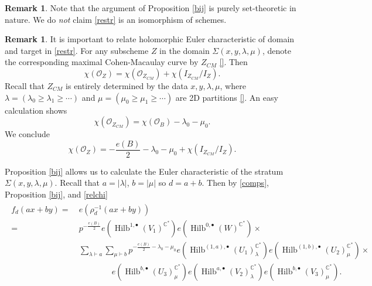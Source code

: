 \documentclass{amsart}
\theoremstyle{definition}
\newtheorem{remark}[theorem]{Remark}
\newcommand{\CC} {\mathbb{C}}          %
\renewcommand{\O}{\mathcal{O}}
\newcommand{\Hilb}{\operatorname{Hilb}}
\begin{document}
\begin{remark}
Note that the argument of Proposition \ref{bij} is purely set-theoretic in nature. We do \emph{not} claim \eqref{restr} is an isomorphism of schemes. 
\end{remark}

\begin{remark}
It is important to relate holomorphic Euler characteristic of domain and target in \eqref{restr}. For any subscheme $Z$ in the domain $\Sigma(x,y,\lambda,\mu)$, denote the corresponding maximal Cohen-Macaulay curve by $Z_{CM}$ \ref{}. Then
$$
\chi(\O_Z) = \chi(\O_{Z_{CM}}) + \chi(I_{Z_{CM}} / I_{Z}).
$$ 
Recall that $Z_{CM}$ is entirely determined by the data $x,y, \lambda, \mu$, where $\lambda = (\lambda_0 \geq \lambda_1 \geq \cdots)$ and $\mu = (\mu_0 \geq \mu_1 \geq \cdots)$ are 2D partitions \ref{}. An easy calculation shows 
$$
\chi(\O_{Z_{CM}}) = \chi(\O_B) - \lambda_0 - \mu_0.
$$
We conclude
\begin{equation} \label{relchi}
\chi(\O_Z) = -\frac{e(B)}{2} - \lambda_0 - \mu_0 + \chi(I_{Z_{CM}} / I_{Z}).
\end{equation}
\end{remark}

Proposition \ref{bij} allows us to calculate the Euler characteristic of the stratum $\Sigma(x,y,\lambda,\mu)$. Recall that $a = |\lambda|$, $b=|\mu|$ so $d=a+b$. Then by \eqref{comps}, Proposition \ref{bij}, and \eqref{relchi}
\begin{align}
\begin{split} \label{fdintermediate}
f_d(ax+by) = \ &e(\rho_{d}^{-1}(ax+by)) \\
= \ &p^{-\frac{e(B)}{2}} e(\Hilb^{1,\bullet}(V_1)^{\CC^*}) e(\Hilb^{0,\bullet}(W)^{\CC^*}) \times \\
&\sum_{\lambda \vdash a} \sum_{\mu \vdash b} p^{-\frac{e(B)}{2} - \lambda_0 - \mu_0 } e(\Hilb^{(1,a),\bullet}(U_1)_{\lambda}^{\CC^*}) e(\Hilb^{(1,b),\bullet}(U_2)_{\mu}^{\CC^*}) \times \\
&\qquad\qquad e(\Hilb^{b,\bullet}(U_3)_{\mu}^{\CC^*}) e(\Hilb^{a,\bullet}(V_2)_{\lambda}^{\CC^*}) e(\Hilb^{b,\bullet}(V_3)_{\mu}^{\CC^*}).
\end{split}
\end{align}
\end{document}
